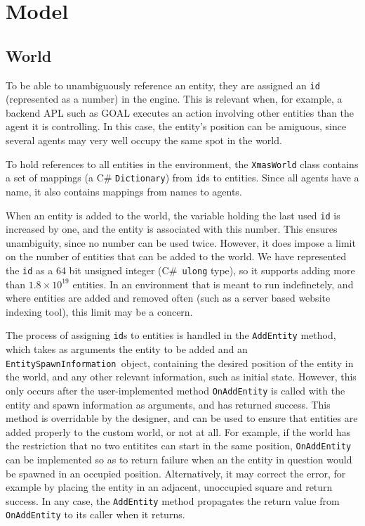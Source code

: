 
\section{Model}


\subsection{World}

To be able to unambiguously reference an entity, they are assigned
an \texttt{id} (represented as a number) in the engine. This is relevant
when, for example, a backend APL such as GOAL executes an action involving
other entities than the agent it is controlling. In this case, the
entity's position can be amiguous, since several agents may very well
occupy the same spot in the world.

To hold references to all entities in the environment, the \texttt{XmasWorld}
class contains a set of mappings (a C\# \texttt{Dictionary}) from
\texttt{id}s to entities. Since all agents have a name, it also contains
mappings from names to agents. 

When an entity is added to the world, the variable holding the last
used \texttt{id} is increased by one, and the entity is associated
with this number. This ensures unambiguity, since no number can be
used twice. However, it does impose a limit on the number of entities
that can be added to the world. We have represented the \texttt{id}
as a 64 bit unsigned integer (C\#\texttt{ ulong} type), so it supports
adding more than $1.8\times10^{19}$ entities. In an environment that
is meant to run indefinetely, and where entities are added and removed
often (such as a server based website indexing tool), this limit may
be a concern. 

The process of assigning \texttt{id}s to entities is handled in the
\texttt{AddEntity} method, which takes as arguments the entity to
be added and an \texttt{EntitySpawnInformation }object, containing
the desired position of the entity in the world, and any other relevant
information, such as initial state. However, this only occurs after
the user-implemented method \texttt{OnAddEntity} is called with the
entity and spawn information as arguments, and has returned success.
This method is overridable by the designer, and can be used to ensure
that entities are added properly to the custom world, or not at all.
For example, if the world has the restriction that no two entitites
can start in the same position, \texttt{OnAddEntity} can be implemented
so as to return failure when an the entity in question would be spawned
in an occupied position. Alternatively, it may correct the error,
for example by placing the entity in an adjacent, unoccupied square
and return success. In any case, the \texttt{AddEntity} method propagates
the return value from \texttt{OnAddEntity} to its caller when it returns.

